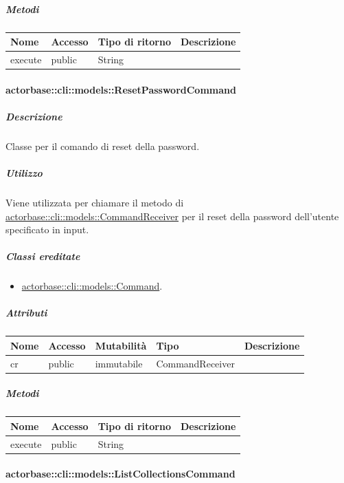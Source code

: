 \documentclass{scalatekids-article}
\begin{document}
\subparagraph{Metodi}

\begin{tabular}{| l | l | l | l |}
  \hline
  Nome & Accesso & Tipo di ritorno & Descrizione\\
  \hline
  execute & public & String & \\
  \hline
\end{tabular}

\paragraph{actorbase::cli::models::ResetPasswordCommand}
\label{sec:actorbase::cli::models::ResetPasswordCommand}

\subparagraph{Descrizione}

Classe per il comando di reset della password.

\subparagraph{Utilizzo}

Viene utilizzata per chiamare il metodo di
\hyperref[sec:actorbase::cli::models::CommandReceiver]{actorbase::cli::models::CommandReceiver} per il reset della password
dell'utente specificato in input.

\subparagraph{Classi ereditate}

\begin{itemize}
\item \hyperref[sec:actorbase::cli::models::Command]{actorbase::cli::models::Command}.
\end{itemize}

\subparagraph{Attributi}

\begin{tabular}{| l | l | l | l | l |}
  \hline
  Nome & Accesso & Mutabilità & Tipo & Descrizione\\
  \hline
  cr & public & immutabile & CommandReceiver & \\
  \hline
\end{tabular}

\subparagraph{Metodi}

\begin{tabular}{| l | l | l | l |}
  \hline
  Nome & Accesso & Tipo di ritorno & Descrizione\\
  \hline
  execute & public & String & \\
  \hline
\end{tabular}

\paragraph{actorbase::cli::models::ListCollectionsCommand}
\label{sec:actorbase::cli::models::ListCollectionsCommand}
\end{document}

